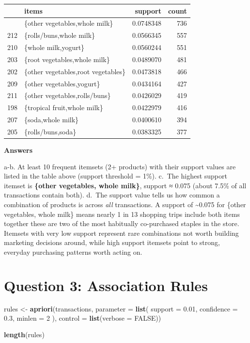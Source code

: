 \documentclass[
]{article}
\newenvironment{Shaded}{\begin{snugshade}}{\end{snugshade}}
\newcommand{\AttributeTok}[1]{\textcolor[rgb]{0.13,0.29,0.53}{#1}}
\newcommand{\ConstantTok}[1]{\textcolor[rgb]{0.56,0.35,0.01}{#1}}
\newcommand{\DecValTok}[1]{\textcolor[rgb]{0.00,0.00,0.81}{#1}}
\newcommand{\FloatTok}[1]{\textcolor[rgb]{0.00,0.00,0.81}{#1}}
\newcommand{\FunctionTok}[1]{\textcolor[rgb]{0.13,0.29,0.53}{\textbf{#1}}}
\newcommand{\NormalTok}[1]{#1}
\newcommand{\OtherTok}[1]{\textcolor[rgb]{0.56,0.35,0.01}{#1}}
\newcounter{none} %
\begin{document}
{\def\LTcaptype{none} %
\begin{longtable}[]{@{}llrr@{}}
\toprule\noalign{}
& items & support & count \\
\midrule\noalign{}
\endhead
\bottomrule\noalign{}
\endlastfoot
213 & \{other vegetables,whole milk\} & 0.0748348 & 736 \\
212 & \{rolls/buns,whole milk\} & 0.0566345 & 557 \\
210 & \{whole milk,yogurt\} & 0.0560244 & 551 \\
203 & \{root vegetables,whole milk\} & 0.0489070 & 481 \\
202 & \{other vegetables,root vegetables\} & 0.0473818 & 466 \\
209 & \{other vegetables,yogurt\} & 0.0434164 & 427 \\
211 & \{other vegetables,rolls/buns\} & 0.0426029 & 419 \\
198 & \{tropical fruit,whole milk\} & 0.0422979 & 416 \\
207 & \{soda,whole milk\} & 0.0400610 & 394 \\
205 & \{rolls/buns,soda\} & 0.0383325 & 377 \\
\end{longtable}
}

\textbf{Answers}

a-b. At least 10 frequent itemsets (2+ products) with their support
values are listed in the table above (support threshold = 1\%). c.~The
highest support itemset is \textbf{\{other vegetables, whole milk\}},
support ≈ 0.075 (about 7.5\% of all transactions contain both). d.~The
support value tells us how common a combination of products is across
\emph{all} transactions. A support of \textasciitilde0.075 for \{other
vegetables, whole milk\} means nearly 1 in 13 shopping trips include
both items together these are two of the most habitually co-purchased
staples in the store. Itemsets with very low support represent rare
combinations not worth building marketing decisions around, while high
support itemsets point to strong, everyday purchasing patterns worth
acting on.

\section{Question 3: Association
Rules}\label{question-3-association-rules}

\begin{Shaded}
\begin{Highlighting}[]
\NormalTok{rules }\OtherTok{\textless{}{-}} \FunctionTok{apriori}\NormalTok{(transactions, }\AttributeTok{parameter =} \FunctionTok{list}\NormalTok{(}
  \AttributeTok{support =} \FloatTok{0.01}\NormalTok{,}
  \AttributeTok{confidence =} \FloatTok{0.3}\NormalTok{,}
  \AttributeTok{minlen =} \DecValTok{2}
\NormalTok{), }\AttributeTok{control =} \FunctionTok{list}\NormalTok{(}\AttributeTok{verbose =} \ConstantTok{FALSE}\NormalTok{))}

\FunctionTok{length}\NormalTok{(rules)}
\end{Highlighting}
\end{Shaded}
\end{document}
